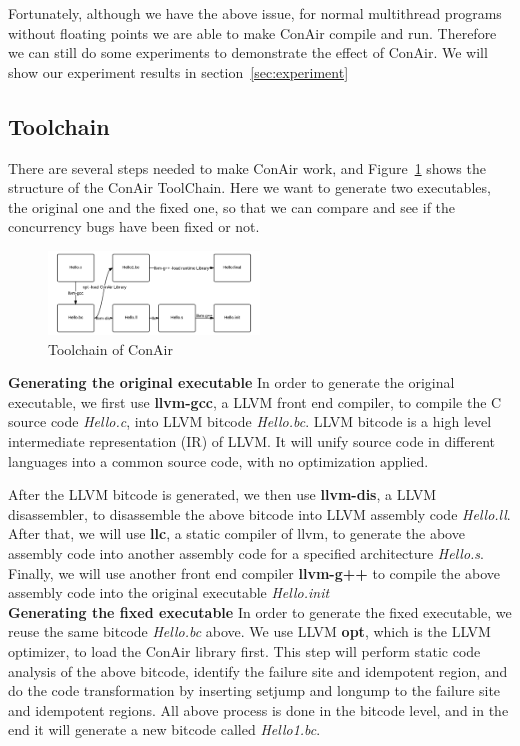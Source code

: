 Fortunately, although we have the above issue, for normal multithread programs
without floating points we are able to make ConAir compile and run. Therefore we
can still do some experiments to demonstrate the effect of ConAir. We will show
our experiment results in section~\ref{sec:experiment}

\subsection{Toolchain}
There are several steps needed to make ConAir work, and
Figure~\ref{fig:toolchain} shows the structure of the ConAir ToolChain. Here we
want to generate two executables, the original one and the fixed one, so that we
can compare and see if the concurrency bugs have been fixed or not.\\
\begin{figure}[htbp]
\centering
\includegraphics[width=0.5\textwidth]{figs/toolchain.png}
\caption{Toolchain of ConAir}
\label{fig:toolchain}
\end{figure}
\textbf{Generating the original executable}
In order to generate the original executable, we first use \textbf{llvm-gcc}, a
LLVM front end compiler, to compile the C source code \textit{Hello.c}, into
LLVM bitcode \textit{Hello.bc}. LLVM bitcode is a high level intermediate
representation (IR) of LLVM. It will unify source code in different languages
into a common source code, with no optimization applied.

After the LLVM bitcode is generated, we then use \textbf{llvm-dis}, a LLVM
disassembler, to disassemble the above bitcode into LLVM assembly code
\textit{Hello.ll}. After that, we will use \textbf{llc}, a static compiler of
llvm, to generate the above assembly code into another assembly code for a
specified architecture \textit{Hello.s}. Finally, we will use another front end
compiler \textbf{llvm-g++} to compile the above assembly code into the original
executable \textit{Hello.init}\\

\textbf{Generating the fixed executable}
In order to generate the fixed executable, we reuse the same bitcode
\textit{Hello.bc} above. We use LLVM \textbf{opt}, which is the LLVM optimizer,
to load the ConAir library first. This step will perform static code analysis of
the above bitcode, identify the failure site and idempotent region, and do the
code transformation by inserting setjump and longump to the failure site and
idempotent regions. All above process is done in the bitcode level, and in the
end it will generate a new bitcode called \textit{Hello1.bc}.


